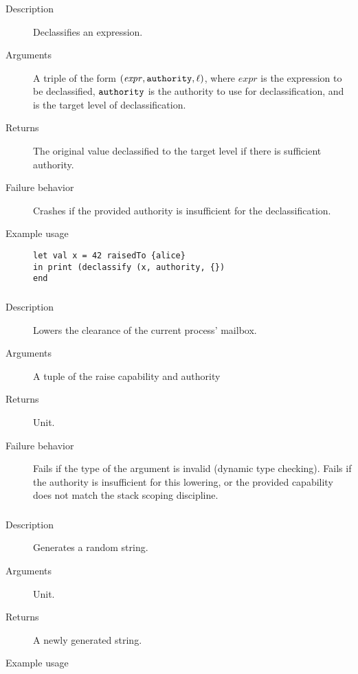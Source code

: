 \subsubsection{}
\begin{description}
    \item [Description] Declassifies an expression.
    \item [Arguments] A triple of the form $(\mathit{expr}, {\mathtt{authority}}, {\mathtt{\ell}} )$, where $\mathit{expr}$ is the expression to be declassified, ${\mathtt{authority}}$ is the authority to use for declassification, and \code{\ell} is the target level of declassification.
    \item [Returns] The original value declassified to the target level if there is sufficient authority. 
    \item [Failure behavior] Crashes if the provided authority is insufficient for the declassification.
    \item [Example usage] 
\begin{minipage}[t]{30em}
\begin{verbatim}
let val x = 42 raisedTo {alice}
in print (declassify (x, authority, {})
end    
\end{verbatim}


 \end{minipage}

    
\end{description}

\subsubsection{}
\begin{description}
    \item [Description] Lowers the clearance of the current process' mailbox. 
    \item [Arguments] A tuple of the raise capability and authority 
    \item [Returns] Unit. 
    \item [Failure behavior] Fails if the type of the argument is invalid (dynamic type checking). Fails if the authority is insufficient for this lowering, or the provided capability does not match the stack scoping discipline. 
\end{description}


\subsubsection{}
\begin{description}
    \item [Description] Generates a random string.
    \item [Arguments] Unit.
    \item [Returns] A newly generated string.
    \item [Example usage] 
\end{description}

